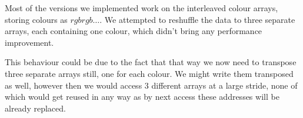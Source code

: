 
Most of the versions we implemented work on the interleaved colour arrays, storing colours as $rgbrgb\dots$. We attempted to reshuffle the data to three separate arrays, each containing one colour, which didn't bring any performance improvement. 

This behaviour could be due to the fact that that way we now need to transpose three separate arrays still, one for each colour. We might write them transposed as well, however then we would access 3 different arrays at a large stride, none of which would get reused in any way as by next access these addresses will be already replaced.

%
%
%
%
